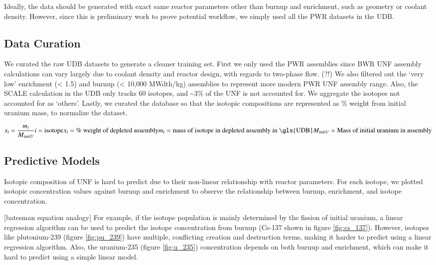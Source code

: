 Ideally, the data should be generated with exact same reactor
parameters other than burnup and enrichment, such as geometry or
coolant density. However, since
this is preliminary work to prove potential workflow, we
simply used all the \gls{PWR} datasets in the \gls{UDB}.


\subsection{Data Curation}

We curated the raw \gls{UDB} datasets to generate
a cleaner training set. First we only used the 
\gls{PWR} assemblies since \gls{BWR} \gls{UNF} assembly
calculations can vary largely due to coolant density
and reactor design, with regards to two-phase flow. (?!)
We also filtered out the 
`very low' enrichment (< 1.5) and burnup (< 10,000 MWdth/kg)
assemblies to represent more modern \gls{PWR} \gls{UNF}
assembly range.
Also, the SCALE calculation in the \gls{UDB} only tracks 60 isotopes,
and \textasciitilde 3\% of the \gls{UNF} is not accounted for. We
aggregate the isotopes not accounted for as `others'. Lastly,
we curated the database so that the isotopic compositions are 
represented as \% weight from initial uranium mass, to normalize
the dataset.

\begin{equation}
x_i = \frac{m_i}{M_{initU}}
i = \text{isotope}
x_i = \text{\% weight of depleted assembly}
m_i = \text{mass of isotope in depleted assembly in \gls{UDB}}
M_{initU} = \text{Mass of initial uranium in assembly}
\end{equation}


\subsection{Predictive Models}

Isotopic composition of \gls{UNF} is hard to predict due to their
non-linear relationship with reactor parameters. For each
isotope, we plotted isotopic concentration values against
burnup and enrichment to observe the relationship between
burnup, enrichment, and isotope concentration.

[batesman equation analogy]
For example, if the isotope population is mainly determined by
the fission of initial uranium, a linear regression algorithm
can be used to predict the isotope concentration from burnup
(Cs-137 shown in figure \ref{fig:cs_137}).
However, isotopes like plutonium-239 (figure \ref{fig:pu_239}) have multiple, conflicting creation
and destruction terms, making it harder to predict using a
linear regression algorithm. Also, the uranium-235 (figure \ref{fig:u_235}) concentration
depends on both burnup and enrichment, which can make it
hard to predict using a simple linear model.

